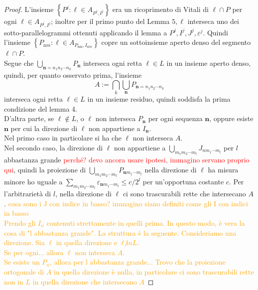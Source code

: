 \documentclass[a4paper, twoside,openright]{article}
\newcommand{\<}{\langle}
\renewcommand{\>}{\rangle}
\begin{document}
\begin{proof}
L'insieme $\left\{P^{j}: \ell \in A_{P^{j}, I^{j}}\right\}$ era un ricoprimento di Vitali di $\ell \cap P$ per ogni $\ell \in A_{P^{j}, I^{j}}$; inoltre per il primo punto del Lemma $5, \ell$ interseca uno dei sotto-parallelogrammi ottenuti applicando il lemma a $P^{j}, I^{j}, J^{j}, \varepsilon^{j}$. Quindi l'insieme $\left\{P_{\mathrm{n} m}: \ell \in A_{P_{\mathrm{nm}}, I_{\mathrm{n} m}}\right\}$
copre un sottoinsieme aperto denso del segmento $\ell \cap P$.\\
Segue che $\bigcup_{\mathbf{n}=n_{1} n_{2} \cdots n_{k}} P_{\mathbf{n}}$ interseca ogni retta $\ell \in L$ in un insieme aperto denso, quindi, per quanto osservato prima, l'insieme 
$$
A:= \bigcap_{k} \bigcup_{\mathbf{n}} P_{\mathbf{n}=n_{1} n_{2} \cdots n_{k}}
$$
interseca ogni retta $\ell \in L$ in un insieme residuo, quindi soddisfa la prima condizione del lemma 4.\\
D'altra parte, se $\ell \notin L$, o $\ell$ non interseca $P_{\mathbf{n}}$ per ogni sequenza $\mathbf{n}$, oppure esiste $\mathbf{n}$ per cui la direzione di $\ell$ non appartiene a $I_{\mathbf{n}}$.\\
Nel primo caso in particolare si ha che $\ell$ non interseca $A$.\\
Nel secondo caso, la direzione di $\ell$ non appartiene a $\bigcup_{m_{1} m_{2} \cdots m_{l}} J_{n m_{1} \cdots m_{l}}$ per $l$ abbastanza grande \textcolor{red}{perché? devo ancora usare ipotesi, immagino servano proprio qui}, quindi la proiezione di $\bigcup_{m_{1} m_{2} \cdots m_{l}} P_{\mathbf{n} m_{1} \cdots m_{l}}$ nella direzione di $\ell$ ha misura minore ho uguale a $\sum_{m_{1} m_{2} \cdots m_{l}} \varepsilon_{\mathbf{n} m_{1} \cdots m_{l}} \leq c/2^l$ per un'opportuna costante $c$. Per l'arbitrarietà di $l$, nella direzione di $\ell$ ci sono trascurabili rette che intersecano $A$.
\textcolor{orange}{cosa sono i J con indice in basso? immagino siano definiti come gli I con indici in basso\\
Prendo gli $I_n$ contenuti strettamente in quelli prima. In questo modo, è vera la cosa di "l abbastanza grande".
La struttura è la seguente. Consideriamo una direzione. Sia $\ell$ in quella direzione e $\ell \not in L$.\\
Se per ogni... allora $\ell$ non interseca $A$.\\
Se esiste un $P_n$, allora per l abbastanza grande... Trovo che la proiezione ortogonale di $A$ in quella direzione è nulla, in particolare ci sono trascurabili rette non in $L$ in quella direzione che intersecano $A$}
\end{proof}
\end{document}
